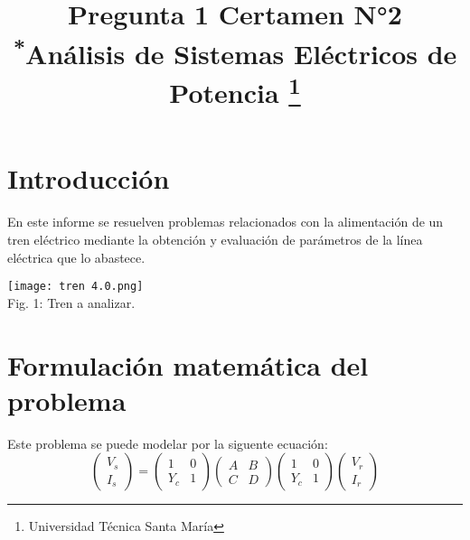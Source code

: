 \documentclass[conference]{IEEEtran}
\begin{document}
\title{Pregunta 1 Certamen N°2\\
{\footnotesize \textsuperscript{*}Análisis de Sistemas Eléctricos de Potencia}
\thanks{Universidad Técnica Santa María}
}

\author{
\and
{}
}

\maketitle


\section{Introducción}
En este informe se resuelven problemas relacionados con la alimentación de un tren eléctrico mediante la obtención y evaluación
de parámetros de la línea eléctrica que lo abastece.
\begin{center}
\texttt{[image: tren 4.0.png]}\\
\small{Fig. 1: Tren a analizar.}
\end{center}


\section{Formulación matemática del problema}
Este problema se puede modelar por la siguente ecuación:
$$
\begin{pmatrix}
V_{s}\\ 
I_{s}
\end{pmatrix}
= 
\begin{pmatrix}
1 & 0\\ 
Y_{c}& 1
\end{pmatrix}
\begin{pmatrix}
A & B\\ 
C & D
\end{pmatrix}
\begin{pmatrix}
1 & 0\\ 
Y_{c}& 1
\end{pmatrix}
\begin{pmatrix}
V_{r}\\ 
I_{r}
\end{pmatrix}
$$
\end{document}
